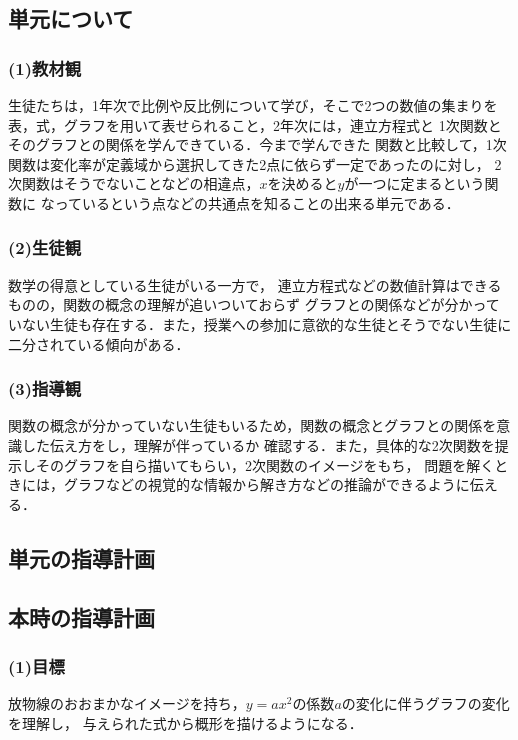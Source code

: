 \documentclass{ltjsarticle}
\begin{document}
\subsection{単元について}\vspace*{-3mm}
  \subsubsection*{(1)教材観}
    生徒たちは，1年次で比例や反比例について学び，そこで2つの数値の集まりを
    表，式，グラフを用いて表せられること，2年次には，連立方程式と
    1次関数とそのグラフとの関係を学んできている．今まで学んできた
    関数と比較して，1次関数は変化率が定義域から選択してきた2点に依らず一定であったのに対し，
    2次関数はそうでないことなどの相違点，\(x\)を決めると\(y\)が一つに定まるという関数に
    なっているという点などの共通点を知ることの出来る単元である．
  \subsubsection*{(2)生徒観}
    数学の得意としている生徒がいる一方で，
    連立方程式などの数値計算はできるものの，関数の概念の理解が追いついておらず
    グラフとの関係などが分かっていない生徒も存在する．また，授業への参加に意欲的な生徒とそうでない生徒に二分されている傾向がある． 
  \subsubsection*{(3)指導観}
    関数の概念が分かっていない生徒もいるため，関数の概念とグラフとの関係を意識した伝え方をし，理解が伴っているか
    確認する．また，具体的な2次関数を提示しそのグラフを自ら描いてもらい，2次関数のイメージをもち，
    問題を解くときには，グラフなどの視覚的な情報から解き方などの推論ができるように伝える．
\subsection{単元の指導計画}\vspace*{-3mm}

\subsection{本時の指導計画}\vspace*{-3mm}
  \subsubsection*{(1)目標}
    放物線のおおまかなイメージを持ち，\(y=ax^2\)の係数\(a\)の変化に伴うグラフの変化を理解し，
    与えられた式から概形を描けるようになる．
\end{document}
